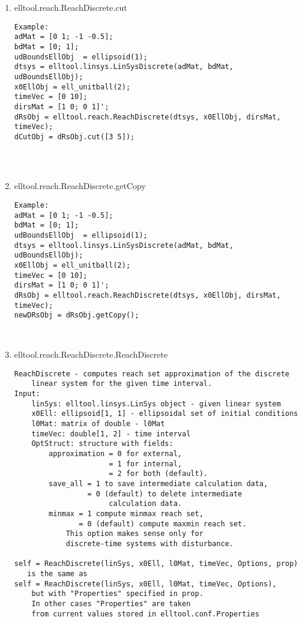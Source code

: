 \begin{enumerate}
\begin{lstlisting}
\end{lstlisting}
\fontfamily{\familydefault}
\selectfont
\item {elltool.reach.ReachDiscrete.cut}
\selectfont
\begin{lstlisting}
Example:
adMat = [0 1; -1 -0.5];
bdMat = [0; 1];
udBoundsEllObj  = ellipsoid(1);
dtsys = elltool.linsys.LinSysDiscrete(adMat, bdMat, udBoundsEllObj);
x0EllObj = ell_unitball(2);
timeVec = [0 10];
dirsMat = [1 0; 0 1]';
dRsObj = elltool.reach.ReachDiscrete(dtsys, x0EllObj, dirsMat, timeVec);
dCutObj = dRsObj.cut([3 5]);




\end{lstlisting}
\fontfamily{\familydefault}
\selectfont
\item {elltool.reach.ReachDiscrete.getCopy}
\selectfont
\begin{lstlisting}
Example:
adMat = [0 1; -1 -0.5];
bdMat = [0; 1];
udBoundsEllObj  = ellipsoid(1);
dtsys = elltool.linsys.LinSysDiscrete(adMat, bdMat, udBoundsEllObj);
x0EllObj = ell_unitball(2);
timeVec = [0 10];
dirsMat = [1 0; 0 1]';
dRsObj = elltool.reach.ReachDiscrete(dtsys, x0EllObj, dirsMat, timeVec);
newDRsObj = dRsObj.getCopy();



\end{lstlisting}
\fontfamily{\familydefault}
\selectfont
\item {elltool.reach.ReachDiscrete.ReachDiscrete}
\selectfont
\begin{lstlisting}
ReachDiscrete - computes reach set approximation of the discrete
    linear system for the given time interval.
Input:
    linSys: elltool.linsys.LinSys object - given linear system
    x0Ell: ellipsoid[1, 1] - ellipsoidal set of initial conditions
    l0Mat: matrix of double - l0Mat
    timeVec: double[1, 2] - time interval
    OptStruct: structure with fields:
        approximation = 0 for external,
                      = 1 for internal,
                      = 2 for both (default).
        save_all = 1 to save intermediate calculation data,
                 = 0 (default) to delete intermediate
                      calculation data.
        minmax = 1 compute minmax reach set,
               = 0 (default) compute maxmin reach set.
            This option makes sense only for
            discrete-time systems with disturbance.

self = ReachDiscrete(linSys, x0Ell, l0Mat, timeVec, Options, prop)
   is the same as
self = ReachDiscrete(linSys, x0Ell, l0Mat, timeVec, Options),
    but with "Properties" specified in prop.
    In other cases "Properties" are taken
    from current values stored in elltool.conf.Properties


\end{lstlisting}
\end{enumerate}
